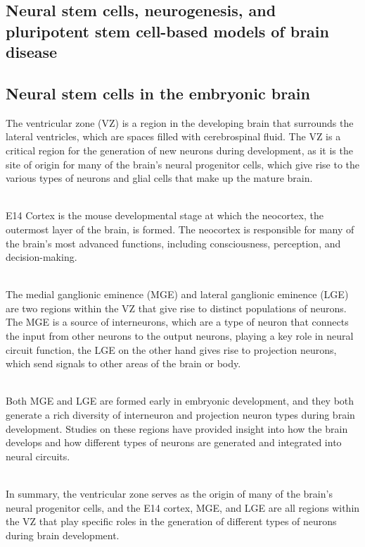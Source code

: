 \begin{itemize}
\begin{itemize}
\section{Neural stem cells, neurogenesis, and pluripotent stem cell-based models of brain disease}
\subsection{Neural stem cells in the embryonic brain}
The ventricular zone (VZ) is a region in the developing brain that surrounds the lateral ventricles, which are spaces filled with cerebrospinal fluid. The VZ is a critical region for the generation of new neurons during development, as it is the site of origin for many of the brain's neural progenitor cells, which give rise to the various types of neurons and glial cells that make up the mature brain.

\\E14 Cortex is the mouse developmental stage at which the neocortex, the outermost layer of the brain, is formed. The neocortex is responsible for many of the brain's most advanced functions, including consciousness, perception, and decision-making.

\\The medial ganglionic eminence (MGE) and lateral ganglionic eminence (LGE) are two regions within the VZ that give rise to distinct populations of neurons. The MGE is a source of interneurons, which are a type of neuron that connects the input from other neurons to the output neurons, playing a key role in neural circuit function, the LGE on the other hand gives rise to projection neurons, which send signals to other areas of the brain or body.

\\Both MGE and LGE are formed early in embryonic development, and they both generate a rich diversity of interneuron and projection neuron types during brain development. Studies on these regions have provided insight into how the brain develops and how different types of neurons are generated and integrated into neural circuits.

\\In summary, the ventricular zone serves as the origin of many of the brain's neural progenitor cells, and the E14 cortex, MGE, and LGE are all regions within the VZ that play specific roles in the generation of different types of neurons during brain development.

\end{itemize}
\end{itemize}
